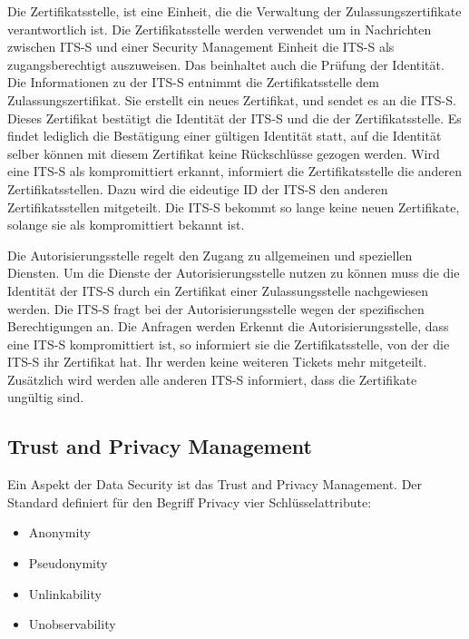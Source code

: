 Die Zertifikatsstelle, ist eine Einheit, die die Verwaltung der Zulassungszertifikate verantwortlich ist. Die Zertifikatsstelle werden verwendet um in Nachrichten zwischen \ac{ITS-S} und einer Security Management Einheit die \ac{ITS-S} als zugangsberechtigt auszuweisen. Das beinhaltet auch die Prüfung der Identität. Die Informationen zu der \ac{ITS-S} entnimmt die Zertifikatsstelle dem Zulassungszertifikat. Sie erstellt ein neues Zertifikat, und sendet es an die \ac{ITS-S}. Dieses Zertifikat bestätigt die Identität der \ac{ITS-S} und die der Zertifikatsstelle. Es findet lediglich die Bestätigung einer gültigen Identität statt,  auf die Identität selber können mit diesem Zertifikat keine Rückschlüsse gezogen werden. Wird eine \ac{ITS-S} als kompromittiert erkannt, informiert die Zertifikatsstelle die anderen Zertifikatsstellen. Dazu wird die eideutige \ac{ID} der \ac{ITS-S} den anderen Zertifikatsstellen mitgeteilt. Die \ac{ITS-S} bekommt so lange keine neuen Zertifikate, solange sie als kompromittiert bekannt ist.  

Die Autorisierungsstelle regelt den Zugang zu allgemeinen und speziellen Diensten. Um die Dienste der Autorisierungsstelle nutzen zu können muss die die Identität der \ac{ITS-S} durch ein Zertifikat einer Zulassungsstelle nachgewiesen werden. Die \ac{ITS-S} fragt bei der Autorisierungsstelle wegen der spezifischen Berechtigungen an. Die Anfragen werden  Erkennt die Autorisierungsstelle, dass eine \ac{ITS-S} kompromittiert ist, so informiert sie die Zertifikatsstelle, von der die \ac{ITS-S} ihr Zertifikat hat. Ihr werden keine weiteren Tickets mehr mitgeteilt. Zusätzlich wird werden alle anderen \ac{ITS-S} informiert, dass die Zertifikate ungültig sind.  


\subsection{Trust and Privacy Management \label{architektur_TrustAndPrivacyManagement}}

Ein Aspekt der Data Security ist das Trust and Privacy Management. Der Standard \cite{ts102941} definiert für  den Begriff Privacy vier Schlüsselattribute:
\begin{itemize}
	\item Anonymity
	\item Pseudonymity
	\item Unlinkability
	\item Unobservability
\end{itemize}


